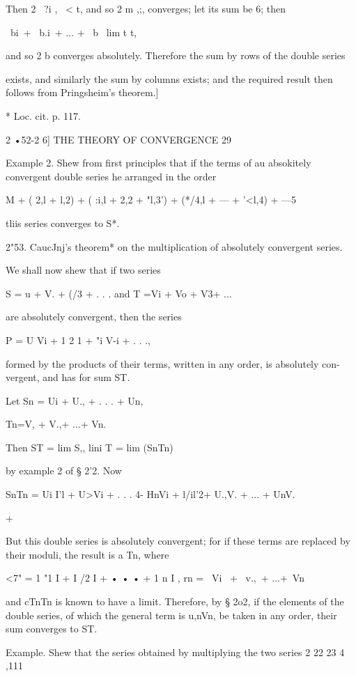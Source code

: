 Then 2 \ ?i , \ < t, and so 2 m ,;, converges; let its sum be 6;
then

\ bi\ + \ b.i\ + ... + \ b \ lim t t,

and so 2 b converges absolutely. Therefore the sum by rows of the
double series

exists, and similarly the sum by columns exists; and the required
result then follows from Pringsheim's theorem.]

* Loc. cit. p. 117.



2 •52-2 6] THE THEORY OF CONVERGENCE 29

Example 2. Shew from first principles that if the terms of au
absokitely convergent double series he arranged in the order

 M + ( 2,l + l,2) + ( :i,l + 2,2 + "l,3') + (*/4,l + --- + '<l,4) +
---5

tliis series converges to S*.

2"53. CaucJnj's theorem* on the multiplication of absolutely
convergent series.

We shall now shew that if two series

S = u + V. + (/3 + . . . and T =Vi + Vo + V3+ ...

are absolutely convergent, then the series

P = U Vi + 1 2 1 + "i V-i + . . .,

formed by the products of their terms, written in any order, is
absolutely con- vergent, and has for sum ST.

Let Sn = Ui + U., + . . . + Un,

Tn=V, + V.,+ ...+ Vn.

Then ST = lim S,, lini T = lim (SnTn)

by example 2 of § 2'2. Now

SnTn = Ui I'l + U>Vi + . . . 4- HnVi + l/il'2+ U.,V. + ... + UnV.

+

But this double series is absolutely convergent; for if these terms
are replaced by their moduli, the result is a Tn, where

<7" = 1 "1 I + I /2 I + • • • + 1 n I , rn = \ Vi \ + \ v.,\ + ...+\
Vn\,

and cTnTn is known to have a limit. Therefore, by § 2o2, if the
elements of the double series, of which the general term is u,nVn, be
taken in any order, their sum converges to ST.

Example. Shew that the series obtained by multiplying the two series 2
22 23 4 ,111

